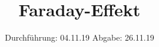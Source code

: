 

\subject{V46}
\title{Faraday-Effekt}
\date{%
  Durchführung: 04.11.19
  \hspace{3em}
  Abgabe: 26.11.19
}



\maketitle
\thispagestyle{empty}
\tableofcontents
\newpage








\printbibliography{}


